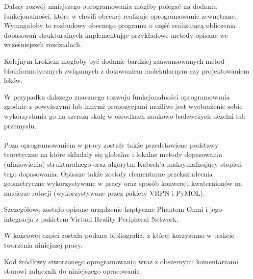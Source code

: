 \documentclass[licencjacka]{pracamgr}
\begin{document}
Dalszy rozwój niniejszego oprogramowania mógłby polegać na dodaniu funkcjonalności, które w chwili obecnej realizuje oprogramowanie zewnętrzne. Wymagałoby to rozbudowy obecnego programu o część realizującą obliczenia dopasowań strukturalnych implementując przykładowe metody opisane we wcześniejszch rozdziałach. 

Kolejnym krokiem mogłoby być dodanie bardziej zaawansowanych metod bioinformatycznych związanych z dokowaniem molekularnym czy projektowaniem leków.

W przypadku dalszego znacznego rozwoju funkcjonalności oprogramowania zgodnie z powyższymi lub innymi propozycjami możliwe jest wyobrażenie sobie wykorzystania go na szerszą skalę w ośrodkach naukowo-badawczych uczelni lub przemysłu.
\\
\\
Poza oprogramowaniem w pracy zostały także przedstawione podstawy teoretyczne na które składały się globalne i lokalne metody dopasowania (uliniowienia) strukturalnego oraz algorytm Kabsch'a maksymalizujący stopień tego dopasowania. Opisane także zostały elementarne przekształcenia geometryczne wykorzystywane w pracy oraz sposób konwersji kwaternionów na macierze rotacji (wykorzystywane przez pakiety VRPN i PyMOL).

Szczegółowo zostało opisane urządzenie haptyczne Phantom Omni i jego integracja z pakietem Virtual Reality Peripheral Network.

W końcowej części została podana bibliografia, z której korzystano w trakcie tworzenia niniejszej pracy. 

Kod źródłowy stworzonego oprogramowania wraz z obszernymi komentarzami stanowi załącznik do niniejszego opracowania.
\end{document}
